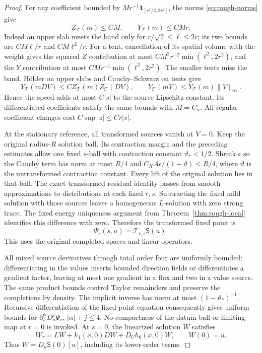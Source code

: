 \documentclass[11pt]{article}
\numberwithin{equation}{section}
\theoremstyle{definition}
\theoremstyle{remark}
\begin{document}
\begin{proof}
For any coefficient bounded by
\(M r^{-1}\mathbf1_{[r^2/2,2r^2]}\), the norms
\eqref{eq:rough-norms} give
\[
 Z_{\mathcal T}(m)\le CM,\qquad
 Y_{\mathcal T}(m)\le CMr.
\]
Indeed an upper slab meets the band only for
\(r/\sqrt2\le\ell\le2r\); its two bounds are
\(CM\ell/r\) and \(CM\ell^2/r\).
For a tent, cancellation of its spatial volume with the
weight gives the squared \(Z\) contribution at most
\(CM^2r^{-2}\min(\ell^2,2r^2)\), and the \(Y\)
contribution at most \(CMr^{-1}\min(\ell^2,2r^2)\).
The smaller tents miss the band. Hölder on upper slabs
and Cauchy--Schwarz on tents give
\[
 Y_{\mathcal T}(mDV)\le
 C Z_{\mathcal T}(m)Z_{\mathcal T}(DV),\qquad
 Y_{\mathcal T}(mV)\le Y_{\mathcal T}(m)\|V\|_\infty .
\]
Hence the speed adds at most \(C|s|\) to the source
Lipschitz constant. Its differentiated coefficients satisfy
the same bounds with \(M=C_\alpha\). All regular coefficient
changes cost \(C\sup|z|\le Cr|s|\).

At the stationary reference, all transformed sources vanish
at \(V=0\). Keep the original radius-\(R\) solution ball.
Its contraction margin and the preceding estimates allow one
fixed \(s\)-ball with contraction constant
\(\vartheta_*<1/2\). Shrink \(\epsilon\) so the Cauchy
term has norm at most \(R/4\) and
\(C_XA\epsilon/(1-\vartheta)\le R/4\), where
\(\vartheta\) is the untransformed contraction constant.
Every lift of the original solution lies in that ball.
The exact transformed residual identity passes from smooth
approximations to distributions at each fixed \(r,s\).
Subtracting the fixed mild solution with those sources
leaves a homogeneous \(L\)-solution with zero strong trace.
The fixed energy uniqueness argument from
Theorem~\ref{thm:rough-local} identifies this difference
with zero. Therefore the transformed fixed point is
\[
 \Psi_r(s,u)=\mathcal T_{r,s}\mathsf S(u).
\]
This uses the original completed spaces and linear operators.

All mixed source derivatives through total order four are
uniformly bounded: differentiating in the values inserts
bounded direction fields or differentiates a gradient factor,
leaving at most one gradient in a flux and two in a value
source. The same product bounds control Taylor remainders
and preserve the completions by density. The implicit inverse
has norm at most \((1-\vartheta_*)^{-1}\). Recursive
differentiation of the fixed-point equation consequently gives
uniform bounds for
\(\partial_s^\alpha D_u^j\Psi_r\), \(|\alpha|+j\le4\).
No compactness of the datum ball or limiting map at \(r=0\)
is invoked. At \(s=0\), the linearized solution \(W\) satisfies
\[
 W_\tau=LW+h_1(x,0)DW+D_Uh_0(x,0)W,\qquad W(0)=u.
\]
Thus \(W=D_u\mathsf S(0)[u]\), including its lower-order terms.


\end{proof}
\end{document}
